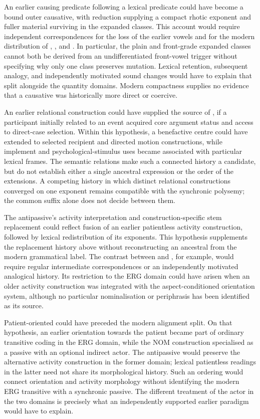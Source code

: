 An earlier causing predicate following a lexical predicate could have become
a bound outer causative, with reduction supplying a compact rhotic exponent
and fuller material surviving in the expanded classes. This account would
require independent correspondences for the loss of the earlier vowels and
for the modern distribution of , , and .
In particular, the plain and front-grade expanded classes cannot both be
derived from an undifferentiated front-vowel trigger without specifying why
only one class preserves mutation. Lexical retention, subsequent analogy,
and independently motivated sound changes would have to explain that split
alongside the quantity domains. Modern compactness supplies no evidence that
a causative was historically more direct or coercive.

An earlier relational construction could have supplied the source of
, if a participant initially related to an event acquired core
argument status and access to direct-case selection. Within this hypothesis,
a benefactive centre could have extended to selected recipient and directed
motion constructions, while implement and psychological-stimulus uses became
associated with particular lexical frames. The semantic relations make such
a connected history a candidate, but do not establish either a single
ancestral expression or the order of the extensions. A competing history in
which distinct relational constructions converged on one exponent remains
compatible with the synchronic polysemy; the common suffix alone does not
decide between them.

The antipassive's activity interpretation and construction-specific stem
replacement could reflect fusion of an earlier patientless activity
construction, followed by lexical redistribution of its exponents. This
hypothesis supplements the replacement history above without reconstructing
an ancestral  from the modern grammatical label. The contrast
between  and , for example, would require regular
intermediate correspondences or an independently motivated analogical
history. Its restriction to the ERG domain could have arisen when an older
activity construction was integrated with the aspect-conditioned orientation
system, although no particular nominalisation or periphrasis has been
identified as its source.

Patient-oriented  could have preceded the modern alignment split.
On that hypothesis, an earlier orientation towards the patient became part
of ordinary transitive coding in the ERG domain, while the NOM construction
specialised as a passive with an optional indirect actor. The antipassive
would preserve the alternative activity construction in the former domain;
lexical patientless readings in the latter need not share its morphological
history. Such an ordering would connect orientation and activity morphology
without identifying the modern ERG transitive with a synchronic passive.
The different treatment of the actor in the two domains is precisely what
an independently supported earlier paradigm would have to explain.

